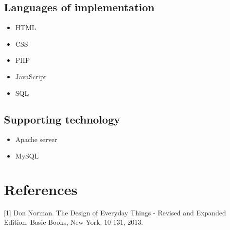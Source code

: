 \documentclass[12pt]{article}
\begin{document}
\subsection{Languages of implementation}
\begin{itemize}
\item HTML
\item CSS
\item PHP
\item JavaScript
\item SQL
\end{itemize}

\subsection{Supporting technology}
\begin{itemize}
\item Apache server
\item MySQL
\end{itemize}

\section{References}
[1] Don Norman. The Design of Everyday Things - Revised and Expanded Edition. Basic
Books, New York, 10-131, 2013.
\end{document}
